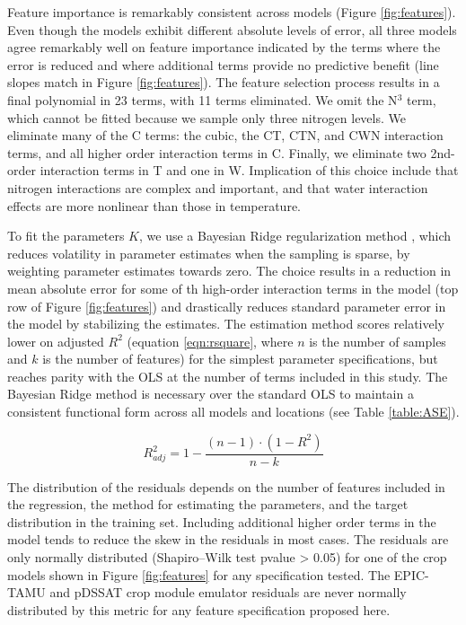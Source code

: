\documentclass[gmd, manuscript]{copernicus} %
\begin{document}
Feature importance is remarkably consistent across models (Figure \ref{fig:features}). 
Even though the models exhibit different absolute levels of error, all three models agree remarkably well on feature importance indicated by the terms where the error is reduced and where additional terms provide no predictive benefit (line slopes match in Figure \ref{fig:features}). 
The feature selection process results in a final polynomial in 23 terms, with 11 terms eliminated. 
We omit the N$^3$ term, which cannot be fitted because we sample only three nitrogen levels. 
We eliminate many of the C terms: the cubic, the CT, CTN, and CWN interaction terms, and all higher order interaction terms in C. 
Finally, we eliminate two 2nd-order interaction terms in T and one in W. 
Implication of this choice include that nitrogen interactions are complex and important, and that water interaction effects are more nonlinear than those in temperature. 

To fit the parameters $K$, we use a Bayesian Ridge regularization method \citep{MacKay91}, which reduces volatility in parameter estimates when the sampling is sparse, by weighting parameter estimates towards zero. 
The choice results in a reduction in mean absolute error for some of th high-order interaction terms in the model (top row of Figure \ref{fig:features}) and drastically reduces standard parameter error in the model by stabilizing the estimates.
The estimation method scores relatively lower on adjusted $R^2$ (equation \ref{eqn:rsquare}, where $n$ is the number of samples and $k$ is the number of features) for the simplest parameter specifications, but reaches parity with the OLS at the number of terms included in this study.
The Bayesian Ridge method is necessary over the standard OLS to maintain a consistent functional form across all models and locations (see Table \ref{table:ASE}). 

\begin{equation}
    \label{eqn:rsquare}
    R^{2}_{adj} = 1 - \frac{(n-1) \cdot (1 - R^{2})}{n - k}
\end{equation}

The distribution of the residuals depends on the number of features included in the regression, the method for estimating the parameters, and the target distribution in the training set. 
Including additional higher order terms in the model tends to reduce the skew in the residuals in most cases.
The residuals are only normally distributed (Shapiro–Wilk test \citep{Shapiro1965} pvalue > 0.05) for one of the crop models shown in Figure \ref{fig:features} for any specification tested.
The EPIC-TAMU and pDSSAT crop module emulator residuals are never normally distributed by this metric for any feature specification proposed here. 
\end{document}

